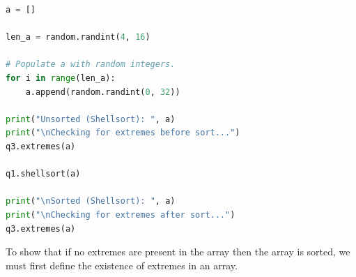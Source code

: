 \documentclass[12pt]{article}
\begin{document}
\pagebreak

\begin{lstlisting}[caption={Test for \textit{Question 3}
(2)},language=Python]
a = []

len_a = random.randint(4, 16)

# Populate a with random integers.
for i in range(len_a):
    a.append(random.randint(0, 32))

print("Unsorted (Shellsort): ", a)
print("\nChecking for extremes before sort...")
q3.extremes(a)

q1.shellsort(a)

print("\nSorted (Shellsort): ", a)
print("\nChecking for extremes after sort...")
q3.extremes(a)
\end{lstlisting}

To show that if no extremes are present in the array then the
array is sorted, we must first define the existence of extremes
in an array.
\end{document}
